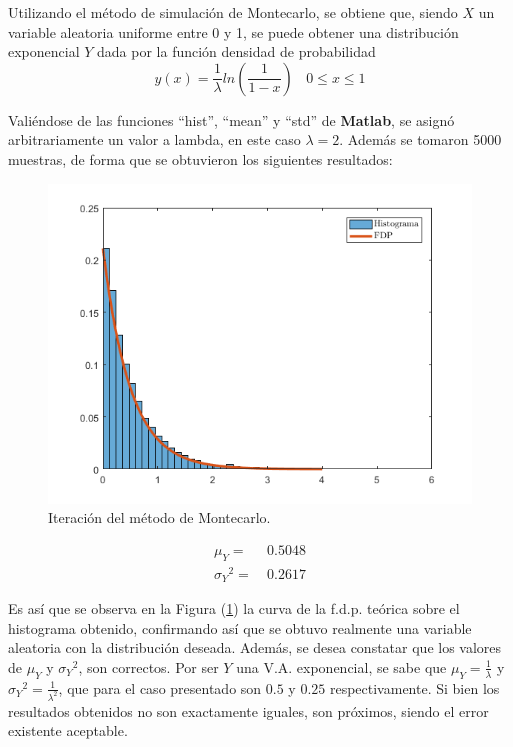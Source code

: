 Utilizando el método de simulación de Montecarlo, se obtiene que, siendo $X$ un variable aleatoria uniforme entre 0 y 1, se puede obtener una distribución exponencial $Y$ dada por la función densidad de probabilidad
\begin{equation}
	y(x) = \frac{1}{\lambda} ln\left( \frac{1}{1 - x} \right) \ \ \ \ 0 \leq x \leq 1
\end{equation}

Valiéndose de las funciones ``hist'', ``mean'' y ``std'' de \textbf{Matlab}, se asignó arbitrariamente un valor a lambda, en este caso $\lambda = 2$. Además se tomaron 5000 muestras, de forma que se obtuvieron los siguientes resultados:
\begin{figure}[H]
	\centering
	\includegraphics[width=0.7\linewidth]{./ImagenesEjercicio1/Simu-1.png}
	\caption{Iteración del método de Montecarlo.}
	\label{fig:primerit}
\end{figure}

\begin{equation}
\begin{aligned}
		\mu_{Y} = & \ 0.5048 \\
		{\sigma_{Y}}^{2} = & \ 0.2617
\end{aligned}
\end{equation}

Es así que se observa en la Figura (\ref{fig:primerit}) la curva de la f.d.p. teórica sobre el histograma obtenido, confirmando así que se obtuvo realmente una variable aleatoria con la distribución deseada. Además, se desea constatar que los valores de $\mu_{Y}$ y ${\sigma_{Y}}^{2}$, son correctos. Por ser $Y$ una V.A. exponencial, se sabe que $\mu_{Y} = \frac{1}{\lambda}$ y ${\sigma_{Y}}^{2} = \frac{1}{\lambda^2}$, que para el caso presentado son $0.5$ y $0.25$ respectivamente. Si bien los resultados obtenidos no son exactamente iguales, son próximos, siendo el error existente aceptable.  

